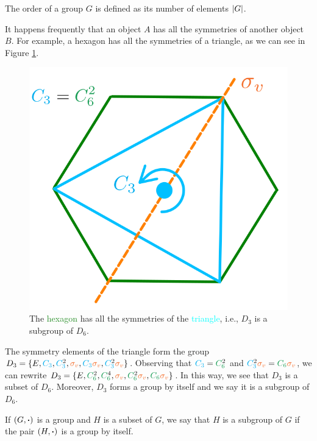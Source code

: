 \begin{definition}
The order of a group $G$ is defined as its number of elements $\abs{G}$.
\end{definition}

It happens frequently that an object $A$ has all the symmetries of another object $B$. For example, a hexagon has all the symmetries of a triangle, as we can see in Figure \ref{fig:hexagon_subgroup}.
\begin{figure}[H]
\centering
\includegraphics[width=0.4\linewidth]{fig/hexagon_subgroup.png}
\caption{The \textcolor{ForestGreen}{hexagon} has all the symmetries of the \textcolor{Cyan}{triangle}, i.e., $D_3$ is a subgroup of $D_6$.}
\label{fig:hexagon_subgroup}
\end{figure}

The symmetry elements of the triangle form the group $D_3 = \{E, \textcolor{Cyan}{C_3}, \textcolor{Cyan}{C_3^{\textcolor{black}{2}}}, \textcolor{Orange}{\sigma_v}, \textcolor{Cyan}{C_3} \textcolor{Orange}{\sigma_v}, \textcolor{Cyan}{C_3^{\textcolor{black}{2}}}\textcolor{Orange}{\sigma_v}\}$. Observing that $\textcolor{Cyan}{C_3} = \textcolor{ForestGreen}{C_6^{\textcolor{black}{2}}}$ and $\textcolor{Cyan}{C_3^{\textcolor{black}{2}}} \textcolor{Orange}{\sigma_v} = \textcolor{ForestGreen}{C_6} \textcolor{Orange}{\sigma_v}$, we can rewrite $D_3 = \{E, \textcolor{ForestGreen}{C_6^{\textcolor{black}{2}}}, \textcolor{ForestGreen}{C_6^{\textcolor{black}{4}}}, \textcolor{Orange}{\sigma_v}, \textcolor{ForestGreen}{C_6^{\textcolor{black}{2}}} \textcolor{Orange}{\sigma_v}, \textcolor{ForestGreen}{C_6} \textcolor{Orange}{\sigma_v} \}$. In this way, we see that $D_3$ is a subset of $D_6$. Moreover, $D_3$ forms a group by itself and we say it is a subgroup of $D_6$.


\begin{definition}
If $(G, \vdot)$ is a group and $H$ is a subset of $G$, we say that $H$ is a subgroup of $G$ if the pair $(H, \vdot)$ is a group by itself.
\end{definition}

